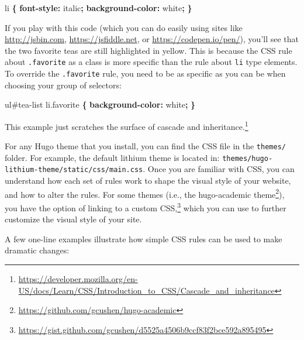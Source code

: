 \documentclass[12pt,]{krantz}
\makeatletter
\newenvironment{Shaded}{\begin{snugshade}}{\end{snugshade}}
\newcommand{\KeywordTok}[1]{\textcolor[rgb]{0.13,0.29,0.53}{\textbf{#1}}}
\newcommand{\DataTypeTok}[1]{\textcolor[rgb]{0.13,0.29,0.53}{#1}}
\newcommand{\FloatTok}[1]{\textcolor[rgb]{0.00,0.00,0.81}{#1}}
\newcommand{\NormalTok}[1]{#1}
\renewcommand{\href}[2]{#2\footnote{\url{#1}}}
\newenvironment{kframe}{%
\medskip{}
\setlength{\fboxsep}{.8em}
 \def\at@end@of@kframe{}%
 \ifinner\ifhmode%
  \def\at@end@of@kframe{\end{minipage}}%
  \begin{minipage}{\columnwidth}%
 \fi\fi%
 \def\FrameCommand##1{\hskip\@totalleftmargin \hskip-\fboxsep
 \colorbox{shadecolor}{##1}\hskip-\fboxsep
     \hskip-\linewidth \hskip-\@totalleftmargin \hskip\columnwidth}%
 \MakeFramed {\advance\hsize-\width
   \@totalleftmargin\z@ \linewidth\hsize
   \@setminipage}}%
 {\par\unskip\endMakeFramed%
 \at@end@of@kframe}
\renewenvironment{Shaded}{\begin{kframe}}{\end{kframe}}
\theoremstyle{definition}
\theoremstyle{definition}
\theoremstyle{definition}
\theoremstyle{remark}
\makeatother
\begin{document}
\begin{Shaded}
\begin{Highlighting}[]
\NormalTok{li }\KeywordTok{\{} 
  \KeywordTok{font-style:} \DataTypeTok{italic}\KeywordTok{;}
  \KeywordTok{background-color:} \DataTypeTok{white}\KeywordTok{;}
\KeywordTok{\}}
\end{Highlighting}
\end{Shaded}

If you play with this code (which you can do easily using sites like
\url{http://jsbin.com}, \url{https://jsfiddle.net}, or
\url{https://codepen.io/pen/}), you'll see that the two favorite teas
are still highlighted in yellow. This is because the CSS rule about
\texttt{.favorite} as a class is more specific than the rule about
\texttt{li} type elements. To override the \texttt{.favorite} rule, you
need to be as specific as you can be when choosing your group of
selectors:

\begin{Shaded}
\begin{Highlighting}[]
\NormalTok{ul}\FloatTok{#tea-list}\NormalTok{ li}\FloatTok{.favorite} \KeywordTok{\{}
  \KeywordTok{background-color:} \DataTypeTok{white}\KeywordTok{;}
\KeywordTok{\}}
\end{Highlighting}
\end{Shaded}

This example just scratches the surface of
\href{https://developer.mozilla.org/en-US/docs/Learn/CSS/Introduction_to_CSS/Cascade_and_inheritance}{cascade
and inheritance.}

For any Hugo theme that you install, you can find the CSS file in the
\texttt{themes/} folder. For example, the default lithium theme is
located in: \texttt{themes/hugo-lithium-theme/static/css/main.css}. Once
you are familiar with CSS, you can understand how each set of rules work
to shape the visual style of your website, and how to alter the rules.
For some themes (i.e., the
\href{https://github.com/gcushen/hugo-academic}{hugo-academic theme}),
you have the option of linking to a
\href{https://gist.github.com/gcushen/d5525a4506b9ccf83f2bce592a895495}{custom
CSS,} which you can use to further customize the visual style of your
site.

A few one-line examples illustrate how simple CSS rules can be used to
make dramatic changes:
\end{document}
